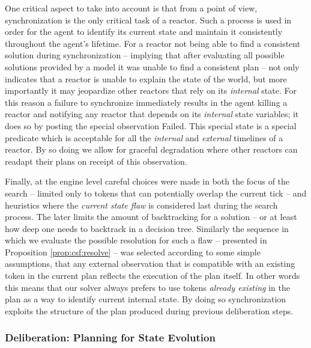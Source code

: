 One critical aspect to take into account is that from a \rx point of
view, synchronization is the only critical task of a reactor. Such a
process is used in order for the agent to identify its current state
and maintain it consistently throughout the agent's lifetime. For a
reactor not being able to find a consistent solution during
synchronization -- implying that after evaluating all possible
solutions provided by a model it was unable to find a consistent plan
-- not only indicates that a reactor is unable to explain the state of
the world, but more importantly it may jeopardize other reactors that
rely on its {\em internal} state. For this reason a failure to
synchronize immediately results in the \rx agent killing a reactor and
notifying any reactor that depends on its {\em internal} state
variables; it does so by posting the special observation
\textsf{Failed}. This special state is a special predicate which is
acceptable for all the {\em internal} and {\em external} timelines of
a \eu reactor.  By so doing we allow for graceful degradation where
other reactors can readapt their plans on receipt of this observation.

Finally, at the engine level careful choices were made in both the
focus of the search -- limited only to tokens that can potentially
overlap the current tick -- and heuristics where the {\em current
  state flaw} is considered last during the search process. The later
limits the amount of backtracking for a solution -- or at least how
deep one needs to backtrack in a decision tree.  Similarly the
sequence in which we evaluate the possible resolution for such a flaw
-- presented in Proposition \ref{prop:csf:resolve} -- was selected
according to some simple assumptions, that any external observation
that is compatible with an existing token in the current plan reflects
the execution of the plan itself. In other words this means that our
solver always prefers to use tokens \emph{already existing} in the
plan as a way to identify current internal state. By doing so
synchronization exploits the structure of the plan produced during
previous deliberation steps.


\subsubsection{Deliberation: Planning for  State Evolution}
\label{sec:arch:plan}

